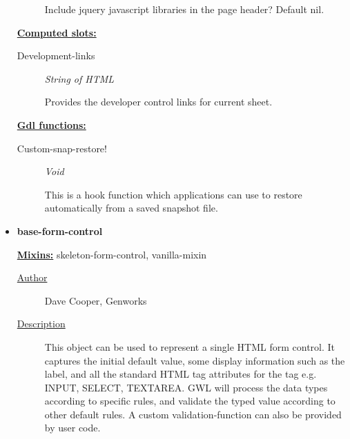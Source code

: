 \documentclass [11pt]{book}
\begin{document}
\begin{itemize}
\begin{description}
 Include jquery javascript libraries in the page header?
Default nil.




\end{description}






\textbf{
\underline{Computed slots:}}

\begin{description}

\item [Development-links]
\emph{String of HTML}

 Provides the developer control links for current sheet.




\end{description}






\textbf{
\underline{Gdl functions:}}

\begin{description}

\item [Custom-snap-restore!]
\emph{Void}

 This is a hook function which applications can use to restore automatically
from a saved snapshot file.




\end{description}







\item {}
\label{prim:base-form-control}
\textbf{base-form-control}


\textbf{
\underline{Mixins:}} skeleton-form-control, vanilla-mixin





\begin{description}

\item [
\underline{Author}]


Dave Cooper, Genworks



\item [
\underline{Description}]


This object can be used to represent a single HTML form control. It captures the 
initial default value, some display information such as the label, and all the standard HTML tag attributes
for the tag e.g. INPUT, SELECT, TEXTAREA. GWL will process the data types according to specific rules,
and validate the typed value according to other default rules. A custom validation-function can also 
be provided by user code. 


\end{description}
\end{itemize}
\end{document}
